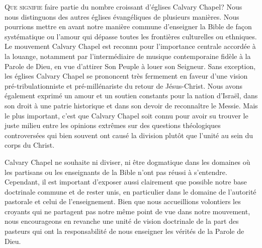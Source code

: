 
\begin{specialpar}{}
\lettrine{Q}{ue signifie} faire partie du nombre \pocketlinebreak
 croissant d'églises Calvary Chapel?
 Nous nous distinguons des autres églises évangéliques de plusieurs manières.
 Nous pourrions mettre en avant notre manière commune d'enseigner la Bible
 de façon systématique ou l'amour qui dépasse toutes les frontières culturelles ou ethniques.
Le mouvement Calvary Chapel est reconnu pour l'importance centrale accordée à la louange,
 notamment par l'intermédiaire de musique con\-tem\-po\-rai\-ne fidèle à la Parole de Dieu,
 en vue d'attirer Son Peuple à louer son Seigneur.
 Sans exception, les églises Calvary Chapel se prononcent très fermement
 en faveur d'une vision pré-tribulationniste et pré-millénariste du retour de Jésus-Christ.
Nous avons également exprimé un amour et un soutien constants pour la nation
 d'Israël,
 dans son droit à une patrie historique  et dans son devoir de reconnaître le Messie.
 Mais le plus important, c'est que Calvary Chapel soit connu pour avoir su trouver
 le juste milieu entre les opinions extrêmes sur des questions théologiques
 controversées qui bien souvent ont causé la division plutôt que l'unité
 au sein du corps du Christ.
\end{specialpar}

Calvary Chapel ne souhaite ni diviser, ni être dogmatique dans les domaines où les partisans
 ou les enseignants de la Bible n'ont pas réussi à s'entendre.
 Cependant, il est important d'exposer aussi clairement que possible notre base doctrinale
 commune et de rester unis, en particulier dans le domaine de l'autorité pastorale
 et celui de l'enseignement. Bien que nous accueillions volontiers les croyants qui
 ne partagent pas notre même point de vue dans notre mouvement,
 nous encourageons en revanche une unité de vision doctrinale de la part des pasteurs
 qui ont la responsabilité de nous enseigner les vérités de la Parole de Dieu.


